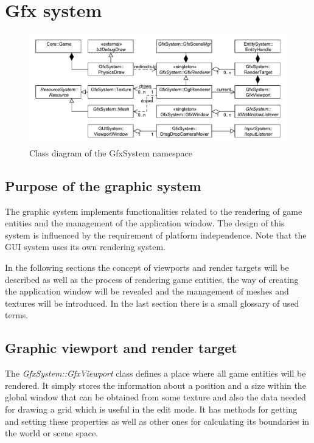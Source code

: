 \documentclass[a4paper, 12pt]{report}
\begin{document}
\chapter{Gfx system}

\begin{figure}[htbp]
	\centering
		\includegraphics[width=1\textwidth]{GfxSystemClassDiagram.pdf}
	\caption{Class diagram of the GfxSystem namespace}
	\label{fig:gfxsystem-diagram}
\end{figure}

\section{Purpose of the graphic system}

The graphic system implements functionalities related to the rendering of game entities and the management of the application window. The design of this system is influenced by the requirement of platform independence. Note that the GUI system uses its own rendering system.

In the following sections the concept of viewports and render targets will be described as well as the process of rendering game entities, the way of creating the application window will be revealed and the management of meshes and textures will be introduced. In the last section there is a small glossary of used terms.

\section{Graphic viewport and render target}
\label{sec:render-target}

The \emph{GfxSystem::GfxViewport} class defines a place where all game entities will be rendered. It simply stores the information about a position and a size within the global window that can be obtained from some texture and also the data needed for drawing a grid which is useful in the edit mode. It has methods for getting and setting these properties as well as other ones for calculating its boundaries in the world or scene space.
\end{document}
